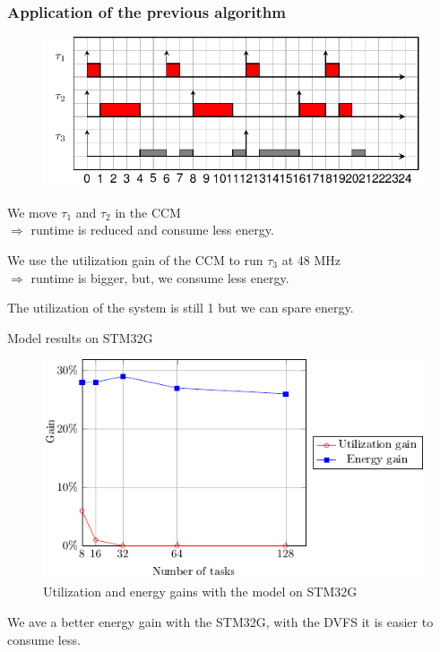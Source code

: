 \documentclass[
	11pt, %
]{beamer}
\begin{document}
\begin{frame}[fragile]
	\frametitle{ Application of the previous algorithm }
	\begin{figure}
		\includegraphics{schedule/offline_algo.pdf}
	\end{figure}
	We move $\tau_1$ and $\tau_2$ in the CCM 
	\\ $\Rightarrow$ runtime is reduced and consume less energy.\newline

	We use the utilization gain of the CCM to run $\tau_3$ at 48 MHz 
	\\$\Rightarrow$ runtime is bigger, but, we consume less energy. \newline

	The utilization of the system is still 1 but we can spare energy.
\end{frame}

\begin{frame}{Model results on STM32G}
	\begin{figure}
		\includegraphics{data/model/results_32g.pdf}
		\caption{Utilization and energy gains with the model on STM32G}
	\end{figure}
	We ave a better energy gain with the STM32G, with the DVFS it is easier to consume less.
\end{frame}
\end{document}

